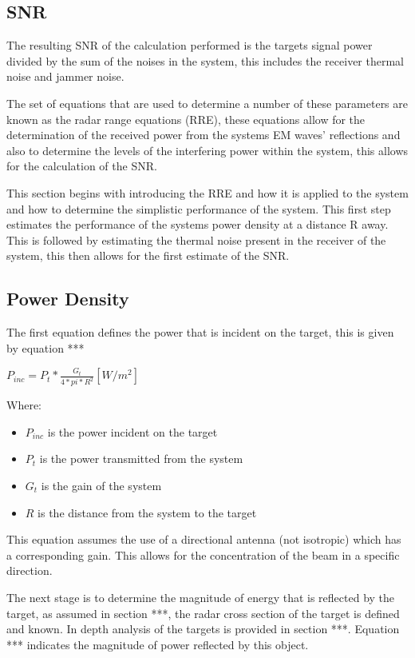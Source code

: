 \documentclass[11pt]{witseiepaper}
\begin{document}
\subsection{SNR} \label{sec:SNR}

The resulting SNR of the calculation performed is the targets signal power divided by the sum of the noises in the system, this includes the receiver thermal noise and jammer noise.

The set of equations that are used to determine a number of these parameters are known as the radar range equations (RRE), these equations allow for the determination of the received power from the systems EM waves' reflections and also to determine the levels of the interfering power within the system, this allows for the calculation of the SNR.

This section begins with introducing the RRE and how it is applied to the system and how to determine the simplistic performance of the system. This first step estimates the performance of the systems power density at a distance R away. This is followed by estimating the thermal noise present in the receiver of the system, this then allows for the first estimate of the SNR. 

\subsection{Power Density} \label{sec:PowerDensity}

The first equation defines the power that is incident on the target, this is given by equation ***

$P_{inc} = P_t * \frac{G_{t}}{4 * pi * R^2} [W/m^2]$

Where:
\begin{itemize}
    \item $P_{inc}$ is the power incident on the target
    \item $P_t$ is the power transmitted from the system
    \item $G_t$ is the gain of the system
    \item $R$ is the distance from the system to the target
\end{itemize}

This equation assumes the use of a directional antenna (not isotropic) which has a corresponding gain. This allows for the concentration of the beam in a specific direction.

The next stage is to determine the magnitude of energy that is reflected by the target, as assumed in section ***, the radar cross section of the target is defined and known. 
In depth analysis of the targets is provided in section ***.
Equation *** indicates the magnitude of power reflected by this object.
\end{document}
